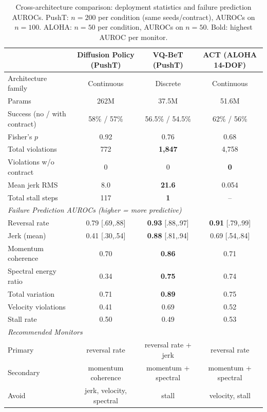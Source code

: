 \documentclass[conference]{IEEEtran}
\begin{document}
\begin{table}[t]
\centering
\caption{Cross-architecture comparison: deployment statistics and failure prediction AUROCs. PushT: $n{=}200$ per condition (same seeds/contract), AUROCs on $n{=}100$. ALOHA: $n{=}50$ per condition, AUROCs on $n{=}50$. Bold: highest AUROC per monitor.}
\label{tab:crossarch}
\small
\begin{tabular}{lccc}
\toprule
 & \textbf{Diffusion Policy (PushT)} & \textbf{VQ-BeT (PushT)} & \textbf{ACT (ALOHA 14-DOF)} \\
\midrule
Architecture family & Continuous & Discrete & Continuous \\
Params & 262M & 37.5M & 51.6M \\
Success (no / with contract) & 58\% / 57\% & 56.5\% / 54.5\% & 62\% / 56\% \\
Fisher's $p$ & 0.92 & 0.76 & 0.68 \\
Total violations & 772 & \textbf{1{,}847} & 4{,}758 \\
Violations w/o contract & 0 & 0 & \textbf{0} \\
Mean jerk RMS & 8.0 & \textbf{21.6} & 0.054 \\
Total stall steps & 117 & \textbf{1} & -- \\
\midrule
\multicolumn{4}{l}{\textit{Failure Prediction AUROCs (higher = more predictive)}} \\
\midrule
Reversal rate & 0.79 {\scriptsize[.69,.88]} & \textbf{0.93} {\scriptsize[.88,.97]} & \textbf{0.91} {\scriptsize[.79,.99]} \\
Jerk (mean) & 0.41 {\scriptsize[.30,.54]} & \textbf{0.88} {\scriptsize[.81,.94]} & 0.69 {\scriptsize[.54,.84]} \\
Momentum coherence & 0.70 & \textbf{0.86} & 0.71 \\
Spectral energy ratio & 0.34 & \textbf{0.75} & 0.74 \\
Total variation & 0.71 & \textbf{0.89} & 0.75 \\
Velocity violations & 0.41 & 0.69 & 0.52 \\
Stall rate & 0.50 & 0.49 & 0.53 \\
\midrule
\multicolumn{4}{l}{\textit{Recommended Monitors}} \\
\midrule
Primary & reversal rate & reversal rate + jerk & reversal rate \\
Secondary & momentum coherence & momentum + spectral & momentum + spectral \\
Avoid & jerk, velocity, spectral & stall & velocity, stall \\
\bottomrule
\end{tabular}
\end{table}
\end{document}
